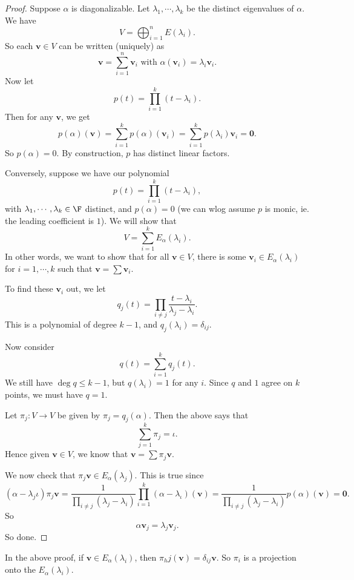 \documentclass[a4paper]{article}
\begin{document}
\begin{proof}
  Suppose $\alpha$ is diagonalizable. Let $\lambda_1, \cdots, \lambda_k$ be the distinct eigenvalues of $\alpha$. We have
  \[
    V = \bigoplus_{i = 1}^n E(\lambda_i).
  \]
  So each $\mathbf{v} \in V$ can be written (uniquely) as
  \[
    \mathbf{v} = \sum_{i = 1}^n \mathbf{v}_i \text{ with }\alpha(\mathbf{v}_i) = \lambda_i \mathbf{v}_i.
  \]
  Now let
  \[
    p(t) = \prod_{i = 1}^k (t - \lambda_i).
  \]
  Then for any $\mathbf{v}$, we get
  \[
    p(\alpha) (\mathbf{v}) = \sum_{i = 1}^k p(\alpha) (\mathbf{v}_i) = \sum_{i = 1}^k p(\lambda_i) \mathbf{v}_i = \mathbf{0}.
  \]
  So $p(\alpha) = 0$. By construction, $p$ has distinct linear factors.

  Conversely, suppose we have our polynomial
  \[
    p(t) = \prod_{i = 1}^k (t - \lambda_i),
  \]
  with $\lambda_1, \cdots, \lambda_k \in \F$ distinct, and $p(\alpha) = 0$ (we can wlog assume $p$ is monic, ie. the leading coefficient is $1$). We will show that
  \[
    V = \sum_{i = 1}^k E_\alpha(\lambda_i).
  \]
  In other words, we want to show that for all $\mathbf{v} \in V$, there is some $\mathbf{v}_i \in E_\alpha(\lambda_i)$ for $i = 1, \cdots, k$ such that $\mathbf{v} = \sum \mathbf{v}_i$.

  To find these $\mathbf{v}_i$ out, we let
  \[
    q_j(t) = \prod_{i \not= j} \frac{t - \lambda_i}{\lambda_j - \lambda_i}.
  \]
  This is a polynomial of degree $k - 1$, and $q_j(\lambda_i) = \delta_{ij}$.

  Now consider
  \[
    q(t) = \sum_{i = 1}^k q_j(t).
  \]
  We still have $\deg q \leq k - 1$, but $q(\lambda_i) = 1$ for any $i$. Since $q$ and $1$ agree on $k$ points, we must have $q = 1$.

  Let $\pi_j: V\to V$ be given by $\pi_j = q_j(\alpha)$. Then the above says that
  \[
    \sum_{j = 1}^k \pi_j = \iota.
  \]
  Hence given $\mathbf{v} \in V$, we know that $\mathbf{v} = \sum \pi_j \mathbf{v}$.

  We now check that $\pi_j \mathbf{v} \in E_\alpha (\lambda_j)$. This is true since
  \[
    (\alpha - \lambda_j\iota) \pi_j \mathbf{v} =\frac{1}{\prod_{i \not= j}(\lambda_j - \lambda_i)} \prod_{i = 1}^k (\alpha - \lambda_\iota) (\mathbf{v}) = \frac{1}{\prod_{i \not= j}(\lambda_j - \lambda_i)} p(\alpha) (\mathbf{v}) = \mathbf{0}.
  \]
  So
  \[
    \alpha \mathbf{v}_j = \lambda_j \mathbf{v}_j.
  \]
  So done.
\end{proof}
In the above proof, if $\mathbf{v} \in E_\alpha(\lambda_i)$, then $\pi_hj(\mathbf{v}) = \delta_{ij}\mathbf{v}$. So $\pi_i$ is a projection onto the $E_\alpha(\lambda_i)$.
\end{document}
